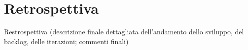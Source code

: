 \section{Retrospettiva}
Restrospettiva (descrizione finale dettagliata dell'andamento dello sviluppo, del backlog, delle iterazioni; commenti finali)